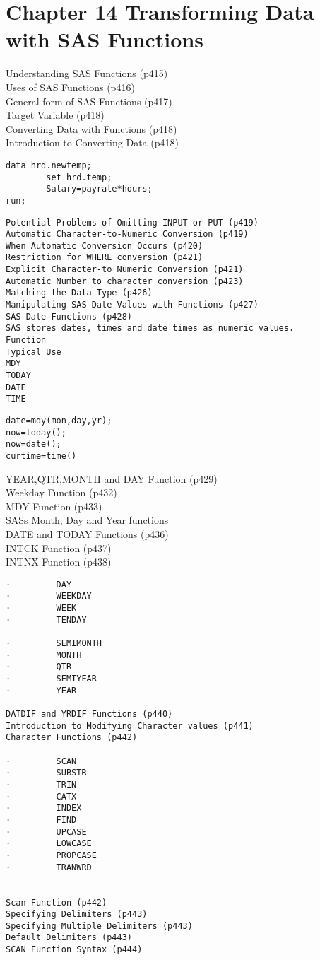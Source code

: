 \section{Chapter 14 Transforming Data with SAS Functions}
Understanding SAS Functions (p415)\\
Uses of SAS Functions (p416)\\
General form of SAS Functions (p417)\\
Target Variable (p418)\\
Converting Data with Functions (p418)\\
Introduction to Converting Data (p418)\\
\begin{framed}
\begin{verbatim}
data hrd.newtemp;
    	set hrd.temp;
    	Salary=payrate*hours;
run;
\end{verbatim}
\end{framed}
\begin{verbatim}
Potential Problems of Omitting INPUT or PUT (p419)
Automatic Character-to-Numeric Conversion (p419)
When Automatic Conversion Occurs (p420)
Restriction for WHERE conversion (p421)
Explicit Character-to Numeric Conversion (p421)
Automatic Number to character conversion (p423)
Matching the Data Type (p426)
Manipulating SAS Date Values with Functions (p427)
SAS Date Functions (p428)
SAS stores dates, times and date times as numeric values.
Function
Typical Use
MDY
TODAY
DATE
TIME
\end{verbatim}
\begin{framed}
\begin{verbatim}
date=mdy(mon,day,yr);
now=today();
now=date();
curtime=time()
\end{verbatim}
\end{framed}
YEAR,QTR,MONTH and DAY Function (p429)\\
Weekday Function (p432)\\
MDY Function (p433)\\
SASs Month, Day and Year functions\\
DATE and TODAY Functions (p436)\\
INTCK Function (p437)\\
INTNX Function (p438)\\
\begin{verbatim}
·         DAY
·         WEEKDAY
·         WEEK
·         TENDAY

·         SEMIMONTH
·         MONTH
·         QTR
·         SEMIYEAR
·         YEAR

DATDIF and YRDIF Functions (p440)
Introduction to Modifying Character values (p441)
Character Functions (p442)

·         SCAN
·         SUBSTR
·         TRIN
·         CATX
·         INDEX
·         FIND
·         UPCASE
·         LOWCASE
·         PROPCASE
·         TRANWRD


Scan Function (p442)
Specifying Delimiters (p443)
Specifying Multiple Delimiters (p443)
Default Delimiters (p443)
SCAN Function Syntax (p444)
\end{verbatim}

